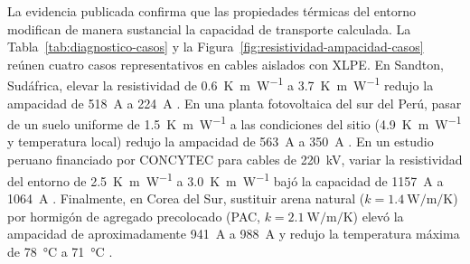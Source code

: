 La evidencia publicada confirma que las propiedades térmicas del entorno modifican de manera sustancial la capacidad de transporte calculada. La Tabla~\ref{tab:diagnostico-casos} y la Figura~\ref{fig:resistividad-ampacidad-casos} reúnen cuatro casos representativos en cables aislados con XLPE. En Sandton, Sudáfrica, elevar la resistividad de \SI{0,6}{\kelvin\metre\per\watt} a \SI{3,7}{\kelvin\metre\per\watt} redujo la ampacidad de \SI{518}{\ampere} a \SI{224}{\ampere} \parencite[5--6, tabs.~2--3]{khumalo2025}. En una planta fotovoltaica del sur del Perú, pasar de un suelo uniforme de \SI{1,5}{\kelvin\metre\per\watt} a las condiciones del sitio (\SI{4,9}{\kelvin\metre\per\watt} y temperatura local) redujo la ampacidad de \SI{563}{\ampere} a \SI{350}{\ampere} \parencite[7--8]{ariasVelasquez2023}. En un estudio peruano financiado por CONCYTEC para cables de \SI{220}{\kilo\volt}, variar la resistividad del entorno de \SI{2,5}{\kelvin\metre\per\watt} a \SI{3,0}{\kelvin\metre\per\watt} bajó la capacidad de \SI{1157}{\ampere} a \SI{1064}{\ampere} \parencite[15--16]{atoccsa2024}. Finalmente, en Corea del Sur, sustituir arena natural ($k=\SI{1,4}{\watt\per\metre\per\kelvin}$) por hormigón de agregado precolocado (PAC, $k=\SI{2,1}{\watt\per\metre\per\kelvin}$) elevó la ampacidad de aproximadamente \SI{941}{\ampere} a \SI{988}{\ampere} y redujo la temperatura máxima de \SI{78}{\celsius} a \SI{71}{\celsius} \parencite[12--16]{kim2025}.

